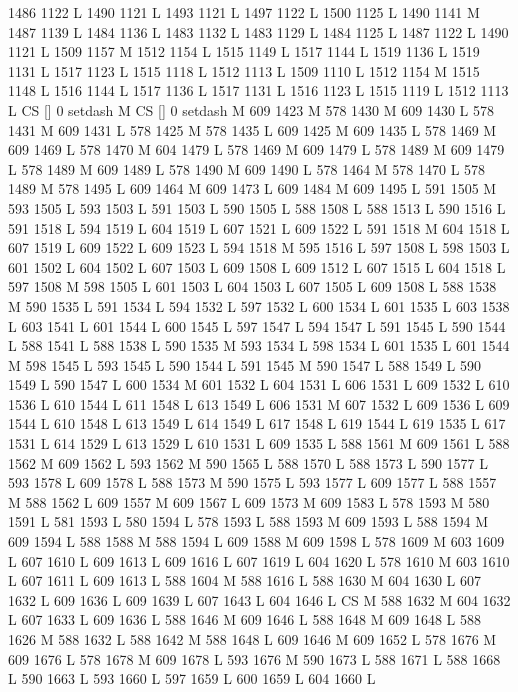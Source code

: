 {{{{{{{{{{{{{{{{{{{{{{{{1486 1122 L
1490 1121 L
1493 1121 L
1497 1122 L
1500 1125 L
1490 1141 M 1487 1139 L
1484 1136 L
1483 1132 L
1483 1129 L
1484 1125 L
1487 1122 L
1490 1121 L
1509 1157 M 1512 1154 L
1515 1149 L
1517 1144 L
1519 1136 L
1519 1131 L
1517 1123 L
1515 1118 L
1512 1113 L
1509 1110 L
1512 1154 M 1515 1148 L
1516 1144 L
1517 1136 L
1517 1131 L
1516 1123 L
1515 1119 L
1512 1113 L
CS [] 0 setdash M
CS [] 0 setdash M
609 1423 M 578 1430 M 609 1430 L
578 1431 M 609 1431 L
578 1425 M 578 1435 L
609 1425 M 609 1435 L
578 1469 M 609 1469 L
578 1470 M 604 1479 L
578 1469 M 609 1479 L
578 1489 M 609 1479 L
578 1489 M 609 1489 L
578 1490 M 609 1490 L
578 1464 M 578 1470 L
578 1489 M 578 1495 L
609 1464 M 609 1473 L
609 1484 M 609 1495 L
591 1505 M 593 1505 L
593 1503 L
591 1503 L
590 1505 L
588 1508 L
588 1513 L
590 1516 L
591 1518 L
594 1519 L
604 1519 L
607 1521 L
609 1522 L
591 1518 M 604 1518 L
607 1519 L
609 1522 L
609 1523 L
594 1518 M 595 1516 L
597 1508 L
598 1503 L
601 1502 L
604 1502 L
607 1503 L
609 1508 L
609 1512 L
607 1515 L
604 1518 L
597 1508 M 598 1505 L
601 1503 L
604 1503 L
607 1505 L
609 1508 L
588 1538 M 590 1535 L
591 1534 L
594 1532 L
597 1532 L
600 1534 L
601 1535 L
603 1538 L
603 1541 L
601 1544 L
600 1545 L
597 1547 L
594 1547 L
591 1545 L
590 1544 L
588 1541 L
588 1538 L
590 1535 M 593 1534 L
598 1534 L
601 1535 L
601 1544 M 598 1545 L
593 1545 L
590 1544 L
591 1545 M 590 1547 L
588 1549 L
590 1549 L
590 1547 L
600 1534 M 601 1532 L
604 1531 L
606 1531 L
609 1532 L
610 1536 L
610 1544 L
611 1548 L
613 1549 L
606 1531 M 607 1532 L
609 1536 L
609 1544 L
610 1548 L
613 1549 L
614 1549 L
617 1548 L
619 1544 L
619 1535 L
617 1531 L
614 1529 L
613 1529 L
610 1531 L
609 1535 L
588 1561 M 609 1561 L
588 1562 M 609 1562 L
593 1562 M 590 1565 L
588 1570 L
588 1573 L
590 1577 L
593 1578 L
609 1578 L
588 1573 M 590 1575 L
593 1577 L
609 1577 L
588 1557 M 588 1562 L
609 1557 M 609 1567 L
609 1573 M 609 1583 L
578 1593 M 580 1591 L
581 1593 L
580 1594 L
578 1593 L
588 1593 M 609 1593 L
588 1594 M 609 1594 L
588 1588 M 588 1594 L
609 1588 M 609 1598 L
578 1609 M 603 1609 L
607 1610 L
609 1613 L
609 1616 L
607 1619 L
604 1620 L
578 1610 M 603 1610 L
607 1611 L
609 1613 L
588 1604 M 588 1616 L
588 1630 M 604 1630 L
607 1632 L
609 1636 L
609 1639 L
607 1643 L
604 1646 L
CS M
588 1632 M 604 1632 L
607 1633 L
609 1636 L
588 1646 M 609 1646 L
588 1648 M 609 1648 L
588 1626 M 588 1632 L
588 1642 M 588 1648 L
609 1646 M 609 1652 L
578 1676 M 609 1676 L
578 1678 M 609 1678 L
593 1676 M 590 1673 L
588 1671 L
588 1668 L
590 1663 L
593 1660 L
597 1659 L
600 1659 L
604 1660 L
}}}}}}}}}}}}}}}}}}}}}}}}
